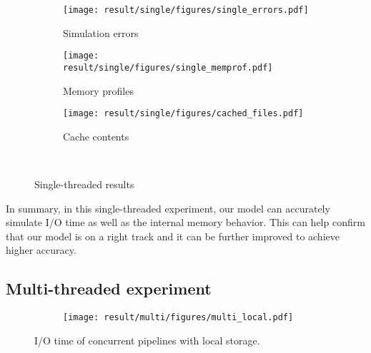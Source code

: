 \documentclass[conference]{IEEEtran}
\begin{document}
            \begin{figure*}
            \centering
            \begin{subfigure}{\linewidth}
                \centering
                   \texttt{[image: result/single/figures/single\_errors.pdf]}
                   \vspace*{-0.7cm}
                   \caption{Simulation errors}
                   \vspace*{0.5cm}
                   \label{fig:single_error}
                \end{subfigure}
            \begin{subfigure}{\linewidth}
                \centering
                   \texttt{[image: result/single/figures/single\_memprof.pdf]}
                   \vspace*{-0.7cm}
                   \caption{Memory profiles}
                   \vspace*{0.5cm}
                   \label{fig:single_memprof}
            \end{subfigure}
            \begin{subfigure}{\linewidth}
                \centering
                   \texttt{[image: result/single/figures/cached\_files.pdf]}
                   \caption{Cache contents}
                   \label{fig:single_cache}
            \end{subfigure}\\
            \caption{Single-threaded results}
            \end{figure*}

            In summary, in this single-threaded experiment, our model can accurately
            simulate I/O time as well as the internal memory behavior.
            This can help confirm that our model is on a right track and
            it can be further improved to achieve higher accuracy.

        \subsection{Multi-threaded experiment}

            \begin{figure*}
            \begin{subfigure}{\linewidth}
                \centering
                \texttt{[image: result/multi/figures/multi\_local.pdf]}
            \end{subfigure}
            \caption{I/O time of concurrent pipelines with local storage.}
            \label{fig:multi_local}
            \end{figure*}
\end{document}
